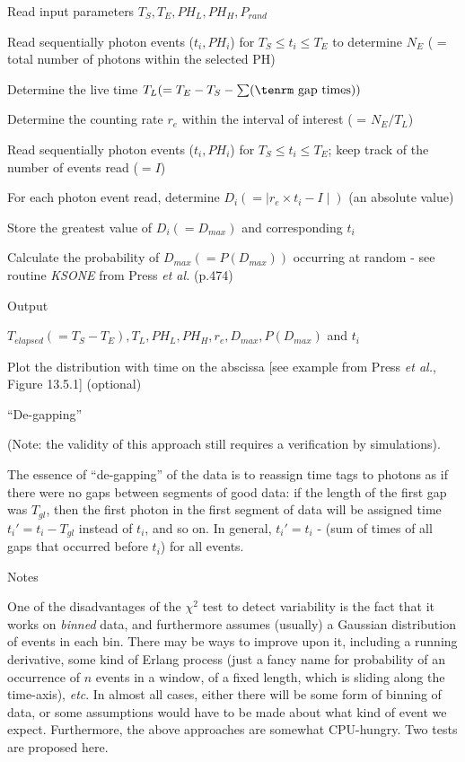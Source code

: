 {\list

Read input parameters $T_S, T_E, PH_L, PH_H, P_{rand}$

Read sequentially photon events ($t_i, PH_i$) for $T_S
\leq t_i \leq T_E$ to determine $N_E$ ( = total
number of photons within the selected PH)

Determine the live time $T_L (=T_E - T_S - \sum ({\rm~gap~times}))$

Determine the counting rate $r_e$ within the interval of interest
( = $N_E/T_L$)

Read sequentially photon events ($t_i, PH_i$) for
$T_S \leq t_i \leq T_E$; keep track of the number of events read ($ = I$)

For each photon event read, determine $D_i( = \mid r_e \times t_i
- I \mid)$ (an absolute value)

Store the greatest value of $D_i ( = D_{max})$ and corresponding
$t_i$

Calculate the probability of $D_{max} ( = P (D_{max}))$ occurring at
random - see routine {\it KSONE} from Press {\it et al.} (p.474)

}

\@{Output}

$T_{elapsed} ( = T_S - T_E), T_L,
PH_L, PH_H, r_e, D_{max}, P ( D_{max})$ and
$t_i$

Plot the distribution with time on the abscissa [see example
from Press {\it et al.}, Figure 13.5.1]  (optional) 

\@{``De-gapping''}

(Note:  the validity of this
approach still requires a verification by simulations).

The essence of ``de-gapping'' of the data is to reassign time tags to
photons as if there were no gaps between segments of good data:  if
the length of the first gap was $T_{gl}$, then the first photon in the
first segment of data will be assigned time $t_i' = t_i - T_{gl}$
instead of $t_i$, and so on.  In general,
$t_i' = t_i$ - (sum of times of all gaps that occurred
before $t_i$) for all events.


\@{Notes}

One of the disadvantages of the $\chi^2$ test to detect variability
is the fact that it works on {\it binned} data, and furthermore
assumes (usually) a Gaussian distribution of events in each bin.
There may be ways to improve upon it, including a running derivative,
some kind of Erlang process (just a fancy name for probability of an
occurrence of $n$ events in a window, of a fixed length, which is
sliding along the time-axis), {\it etc}.  In almost all cases, either there
will be some form of binning of data, or some assumptions would have
to be made about what kind of event we expect.  Furthermore, the above
approaches are somewhat CPU-hungry.  Two tests are proposed here.

